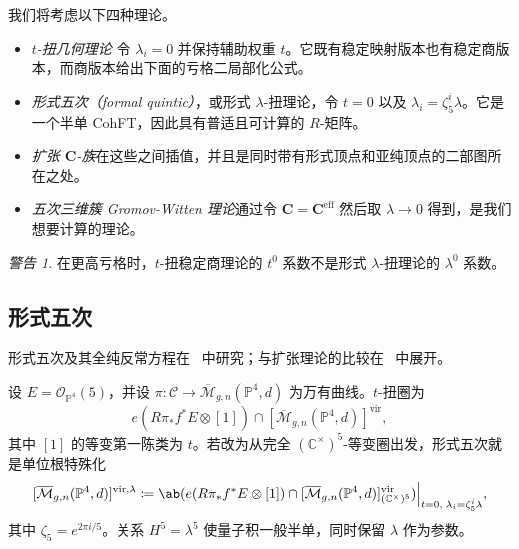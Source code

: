 \documentclass{amsart}
\theoremstyle{definition}
\theoremstyle{remark}
\newtheorem{warn}[thm]{警告}
\theoremstyle{plain}
\theoremstyle{definition}
\theoremstyle{remark}
\newcommand{\C}{\mathbb{C}}
\renewcommand{\P}{\mathbb{P}}
\newcommand{\Mbar}{\overline{\mathcal{M}}}
\newcommand{\mc}[1]{\mathcal{#1}}
\newcommand{\mbf}[1]{\mathbf{#1}}
\newcommand{\mr}[1]{\mathrm{#1}}
\newcommand{\1}{\mathbf{1}}
\newcommand{\2}{\mathbf{2}}
\newcommand{\3}{\mathbf{3}}
\newcommand{\vir}{\mr{vir}}
\begin{document}
我们将考虑以下四种理论。
\begin{itemize}
    \item \textit{\(t\)-扭几何理论} 令 \(\lambda_i = 0\) 并保持辅助权重 \(t\)。它既有稳定映射版本也有稳定商版本，而商版本给出下面的亏格二局部化公式。
    \item \textit{形式五次（formal quintic）}，或形式 \(\lambda\)-扭理论，令 \(t = 0\) 以及 \(\lambda_i = \zeta_5^i \lambda\)。它是一个半单 CohFT，因此具有普适且可计算的 \(R\)-矩阵。
    \item \textit{扩张 \(\mbf{C}\)-族}在这些之间插值，并且是同时带有形式顶点和亚纯顶点的二部图所在之处。
    \item \textit{五次三维簇 Gromov-Witten 理论}通过令 \(\mbf{C} = \mbf{C}^{\mr{eff}}\) 然后取 \(\lambda \to 0\) 得到，是我们想要计算的理论。
\end{itemize}

\begin{warn}
    在更高亏格时，\(t\)-扭稳定商理论的 \(t^0\) 系数不是形式 \(\lambda\)-扭理论的 \(\lambda^0\) 系数。
\end{warn}

\subsection{形式五次}%
\label{sub:The formal quintic}

形式五次及其全纯反常方程在~\cite{LhoPandharipande2019} 中研究；与扩张理论的比较在~\cite{GJRstructure} 中展开。

设 \(E = \mc{O}_{\P^4}(5)\)，并设 \(\pi \colon \mc{C} \to \Mbar_{g,n}(\P^4,d)\) 为万有曲线。\(t\)-扭圈为
\[ e(R\pi_* f^* E \otimes [1]) \cap [\Mbar_{g,n}(\P^4,d)]^{\vir}, \]
其中 \([1]\) 的等变第一陈类为 \(t\)。若改为从完全 \((\C^{\times})^5\)-等变圈出发，形式五次就是单位根特殊化
\[ [\Mbar_{g,n}(\P^4,d)]^{\vir,\lambda} \coloneqq \ab( e(R\pi_*f^*E \otimes [1]) \cap [\Mbar_{g,n}(\P^4,d)]^{\vir}_{(\C^{\times})^5})\Big|_{t=0, \; \lambda_i = \zeta_5^i \lambda}, \]
其中 \(\zeta_5 = e^{2\pi i/5}\)。关系 \(H^5 = \lambda^5\) 使量子积一般半单，同时保留 \(\lambda\) 作为参数。
\end{document}
